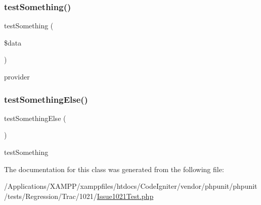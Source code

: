 \mbox{\label{class_issue1021_test_aff40fc92b821163244ff44c1a9e41079}} 
\subsubsection{\texorpdfstring{test\+Something()}{testSomething()}}
{\footnotesize\ttfamily test\+Something (\begin{DoxyParamCaption}\item[{}]{\$data }\end{DoxyParamCaption})}

provider \mbox{\label{class_issue1021_test_abcb919247213405c5d20880827d2972d}} 
\subsubsection{\texorpdfstring{test\+Something\+Else()}{testSomethingElse()}}
{\footnotesize\ttfamily test\+Something\+Else (\begin{DoxyParamCaption}{ }\end{DoxyParamCaption})}

test\+Something 

The documentation for this class was generated from the following file\+:\begin{DoxyCompactItemize}
\item 
/\+Applications/\+X\+A\+M\+P\+P/xamppfiles/htdocs/\+Code\+Igniter/vendor/phpunit/phpunit/tests/\+Regression/\+Trac/1021/\mbox{\hyperlink{_issue1021_test_8php}{Issue1021\+Test.\+php}}\end{DoxyCompactItemize}
